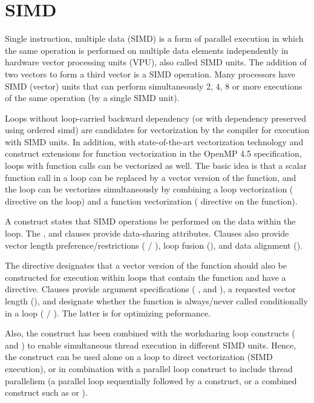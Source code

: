 \pagebreak
\chapter{SIMD}
\label{chap:simd}

Single instruction, multiple data (SIMD) is a form of parallel execution 
in which the same operation is performed on multiple data elements 
independently in hardware vector processing units (VPU), also called SIMD units.
The addition of two vectors to form a third vector is a SIMD operation.
Many processors have SIMD (vector) units that can perform simultaneously 
2, 4, 8 or more executions of the same operation (by a single SIMD unit). 

Loops without loop-carried backward dependency (or with dependency preserved using 
ordered simd) are candidates for vectorization by the compiler for 
execution with SIMD units. In addition, with state-of-the-art vectorization 
technology and  construct extensions for function vectorization
in the OpenMP 4.5 specification, loops with function calls can be vectorized as well. 
The basic idea is that a scalar function call in a loop can be replaced by a vector version 
of the function, and the loop can be vectorizes simultaneously by combining a loop 
vectorization ( directive on the loop) and a function 
vectorization ( directive on the function).

A  construct states that SIMD operations be performed on the
data within the loop.  The ,  and 
 clauses provide data-sharing attributes.  Clauses 
also provide vector length preference/restrictions ( 
/ ), loop fusion (), and data 
alignment ().

The  directive designates
that a vector version of the function should also be constructed for 
execution within loops that contain the function and have a  
directive.  Clauses provide argument specifications ( 
, and ), a requested vector length 
(), and designate whether the function is always/never 
called conditionally in a loop ( / ). 
The latter is for optimizing peformance.

Also, the  construct has been combined with the worksharing loop 
constructs ( and ) to enable simultaneous thread 
execution in different SIMD units.  Hence, the  construct can be 
used alone on a loop to direct vectorization (SIMD execution), or in 
combination with a parallel loop construct to include thread parallelism 
(a parallel loop sequentially followed by a  construct,
or a combined construct such as  or 
).


